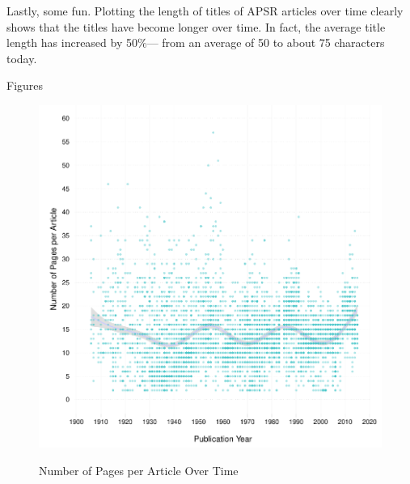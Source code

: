 \documentclass[12pt]{article}
\begin{document}
Lastly, some fun. Plotting the length of titles of APSR articles over time clearly shows that the titles have become longer over time. In fact, the average title length has increased by 50\%--- from an average of 50 to about 75 characters today.

\clearpage
\begin{center}
\large{Figures}
\end{center}

\begin{figure}[htbp]
\centering
\caption{Number of Pages per Article Over Time}
\includegraphics[scale=.85]{../figs/n_pages_per_article_over_time.pdf}
\label{fig:pages}
\end{figure}
\end{document}
